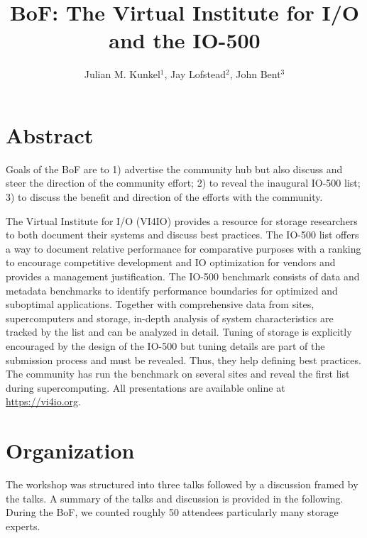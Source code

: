 \documentclass{llncs}
\begin{document}
\mainmatter


\author{Julian M. Kunkel$^1$, Jay Lofstead$^2$, John Bent$^3$}

\title{BoF: The Virtual Institute for I/O and the IO-500}


\maketitle{}

\section{Abstract}

Goals of the BoF are to 1) advertise the community hub but also discuss and steer the direction of the community effort; 2) to reveal the inaugural IO-500 list; 3) to discuss the benefit and direction of the efforts with the community.

The Virtual Institute for I/O (VI4IO) provides a resource for storage researchers to both document their systems and discuss best practices. The IO-500 list offers a way to document relative performance for comparative purposes with a ranking to encourage competitive development and IO optimization for vendors and provides a management justification. The IO-500 benchmark consists of data and metadata benchmarks to identify performance boundaries for optimized and suboptimal applications. Together with comprehensive data from sites, supercomputers and storage, in-depth analysis of system characteristics are tracked by the list and can be analyzed in detail. Tuning of storage is explicitly encouraged by the design of the IO-500 but tuning details are part of the submission process and must be revealed. Thus, they help defining best practices.
The community has run the benchmark on several sites and reveal the first list during supercomputing.
All presentations are available online at \url{https://vi4io.org}.

\section{Organization}

The workshop was structured into three talks followed by a discussion framed by the talks.
A summary of the talks and discussion is provided in the following.
During the BoF, we counted roughly 50 attendees particularly many storage experts.
\end{document}
